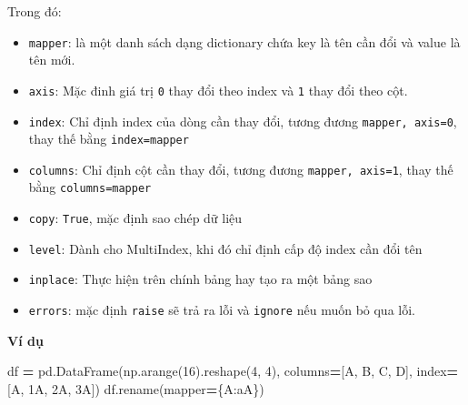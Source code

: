 \documentclass[
]{book}
\newenvironment{Shaded}{\begin{snugshade}}{\end{snugshade}}
\newcommand{\DecValTok}[1]{\textcolor[rgb]{0.00,0.00,0.81}{#1}}
\newcommand{\NormalTok}[1]{#1}
\newcommand{\OperatorTok}[1]{\textcolor[rgb]{0.81,0.36,0.00}{\textbf{#1}}}
\newcommand{\StringTok}[1]{\textcolor[rgb]{0.31,0.60,0.02}{#1}}
\begin{document}
Trong đó:

\begin{itemize}
\item
  \texttt{mapper}: là một danh sách dạng dictionary chứa key là tên cần đổi và value là tên mới.
\item
  \texttt{axis}: Mặc đinh giá trị \texttt{0} thay đổi theo index và \texttt{1} thay đổi theo cột.
\item
  \texttt{index}: Chỉ định index của dòng cần thay đổi, tương đương \texttt{mapper,\ axis=0}, thay thế bằng \texttt{index=mapper}
\item
  \texttt{columns}: Chỉ định cột cần thay đổi, tương đương \texttt{mapper,\ axis=1}, thay thế bằng \texttt{columns=mapper}
\item
  \texttt{copy}: \texttt{True}, mặc định sao chép dữ liệu
\item
  \texttt{level}: Dành cho MultiIndex, khi đó chỉ định cấp độ index cần đổi tên
\item
  \texttt{inplace}: Thực hiện trên chính bảng hay tạo ra một bảng sao
\item
  \texttt{errors}: mặc định \texttt{raise} sẽ trả ra lỗi và \texttt{ignore} nếu muốn bỏ qua lỗi.
\end{itemize}

\textbf{Ví dụ}

\begin{Shaded}
\begin{Highlighting}[]
\NormalTok{df }\OperatorTok{=}\NormalTok{ pd.DataFrame(np.arange(}\DecValTok{16}\NormalTok{).reshape(}\DecValTok{4}\NormalTok{, }\DecValTok{4}\NormalTok{),}
\NormalTok{                        columns}\OperatorTok{=}\NormalTok{[}\StringTok{\textquotesingle{}A\textquotesingle{}}\NormalTok{, }\StringTok{\textquotesingle{}B\textquotesingle{}}\NormalTok{, }\StringTok{\textquotesingle{}C\textquotesingle{}}\NormalTok{, }\StringTok{\textquotesingle{}D\textquotesingle{}}\NormalTok{],}
\NormalTok{                        index}\OperatorTok{=}\NormalTok{[}\StringTok{\textquotesingle{}A\textquotesingle{}}\NormalTok{, }\StringTok{\textquotesingle{}1A\textquotesingle{}}\NormalTok{, }\StringTok{\textquotesingle{}2A\textquotesingle{}}\NormalTok{, }\StringTok{\textquotesingle{}3A\textquotesingle{}}\NormalTok{])}
\NormalTok{df.rename(mapper}\OperatorTok{=}\NormalTok{\{}\StringTok{\textquotesingle{}A\textquotesingle{}}\NormalTok{:}\StringTok{\textquotesingle{}aA\textquotesingle{}}\NormalTok{\})}
\end{Highlighting}
\end{Shaded}
\end{document}
